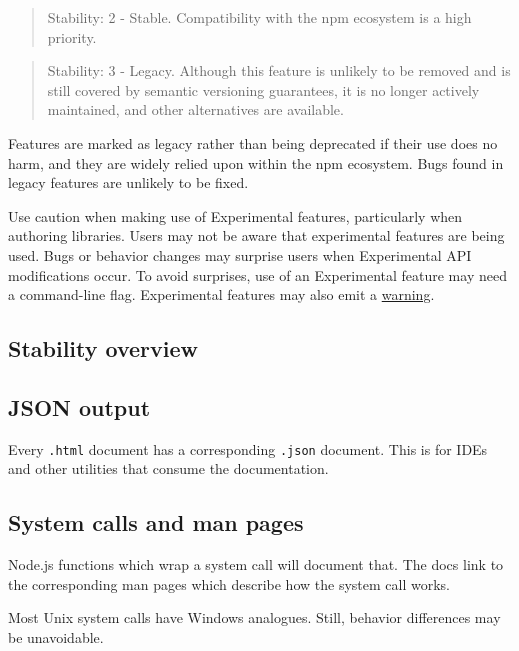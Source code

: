 \begin{quote}
Stability: 2 - Stable. Compatibility with the npm ecosystem is a high
priority.
\end{quote}

\begin{quote}
Stability: 3 - Legacy. Although this feature is unlikely to be removed
and is still covered by semantic versioning guarantees, it is no longer
actively maintained, and other alternatives are available.
\end{quote}

Features are marked as legacy rather than being deprecated if their use
does no harm, and they are widely relied upon within the npm ecosystem.
Bugs found in legacy features are unlikely to be fixed.

Use caution when making use of Experimental features, particularly when
authoring libraries. Users may not be aware that experimental features
are being used. Bugs or behavior changes may surprise users when
Experimental API modifications occur. To avoid surprises, use of an
Experimental feature may need a command-line flag. Experimental features
may also emit a \href{process.md\#event-warning}{warning}.

\subsection{Stability overview}\label{stability-overview}

\subsection{JSON output}\label{json-output}

Every \texttt{.html} document has a corresponding \texttt{.json}
document. This is for IDEs and other utilities that consume the
documentation.

\subsection{System calls and man
pages}\label{system-calls-and-man-pages}

Node.js functions which wrap a system call will document that. The docs
link to the corresponding man pages which describe how the system call
works.

Most Unix system calls have Windows analogues. Still, behavior
differences may be unavoidable.
